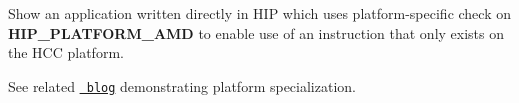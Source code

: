 Show an application written directly in HIP which uses platform-\/specific check on {\bfseries{HIP\+\_\+\+PLATFORM\+\_\+\+AMD}} to enable use of an instruction that only exists on the HCC platform.

See related \href{http://gpuopen.com/platform-aware-coding-inside-hip/}{\texttt{ blog}} demonstrating platform specialization. 